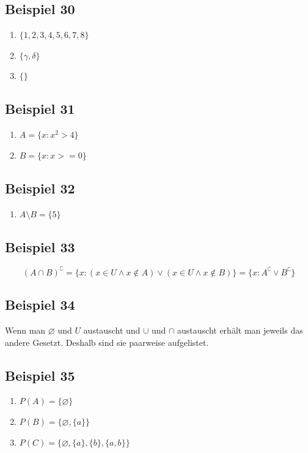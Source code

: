 \documentclass[12pt, a4paper, oneside]{article}
\begin{document}
\subsection{Beispiel 30}
\begin{enumerate}
  \item $\{1, 2, 3, 4, 5, 6, 7, 8\}$
  \item $\{\gamma, \delta\}$
  \item $\{\}$
\end{enumerate}

\subsection{Beispiel 31}
\begin{enumerate}[$\bullet$]
  \item $A = \{x : x^{2} > 4\}$
  \item $B = \{x: x >= 0\}$
\end{enumerate}

\subsection{Beispiel 32}
\begin{enumerate}[$\bullet$]
  \item $A \setminus B = \{5\}$
\end{enumerate}

\subsection{Beispiel 33}
\begin{equation}
  (A \cap B)^{\complement} = \{x : (x \in U \land x \notin A) \lor (x \in U \land x \notin B)\} = \{x : A^{\complement} \lor B^{\complement}\}
\end{equation}

\subsection{Beispiel 34}
Wenn man $\varnothing$ und $U$ austauscht und $\cup$ und $\cap$ austauscht erhält man jeweils das andere Gesetzt. Deshalb sind sie paarweise aufgelistet. 

\subsection{Beispiel 35} 
\begin{enumerate}[$\bullet$]
  \item $P(A) = \{\varnothing\}$
  \item $P(B) = \{\varnothing,\{a\} \}$
  \item $P(C) = \{\varnothing, \{a\}, \{b\}, \{a, b\}\}$
\end{enumerate}
\end{document}
